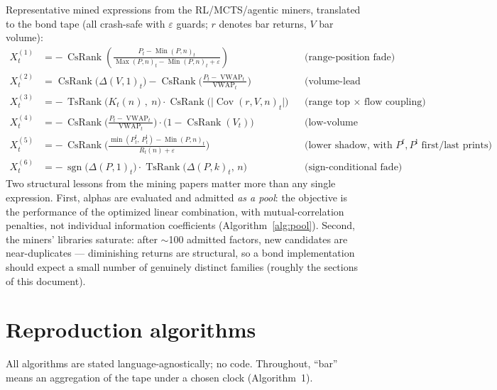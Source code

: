 \documentclass[11pt]{article}
\newcommand{\sgn}{\operatorname{sgn}}
\newcommand{\Rank}{\operatorname{CsRank}}
\newcommand{\TsRank}{\operatorname{TsRank}}
\DeclareMathOperator{\VWAP}{VWAP}
\DeclareMathOperator{\Cov}{Cov}
\newcounter{algo}
\newcounter{fac}
\begin{document}
Representative mined expressions from the RL/MCTS/agentic miners, translated to the bond tape (all crash-safe with $\varepsilon$ guards; $r$ denotes bar returns, $V$ bar volume):
{\small
\begin{align}
X^{(1)}_t &= -\,\Rank\!\left( \frac{P_t - \operatorname{Min}(P,n)_t}{\operatorname{Max}(P,n)_t - \operatorname{Min}(P,n)_t + \varepsilon} \right)
&&\text{(range-position fade)}\\[2pt]
X^{(2)}_t &= \Rank\big(\Delta(V,1)_t\big) - \Rank\!\Big(\tfrac{P_t - \VWAP_t}{\VWAP_t}\Big)
&&\text{(volume-lead divergence)}\\[2pt]
X^{(3)}_t &= -\,\TsRank\!\Big( K_t(n)\,,\ n \Big)\cdot \Rank\!\Big( \big|\Cov(r, V, n)_t\big| \Big)
&&\text{(range top $\times$ flow coupling)}\\[2pt]
X^{(4)}_t &= -\,\Rank\!\Big(\tfrac{P_t-\VWAP_t}{\VWAP_t}\Big)\cdot \big(1 - \Rank(V_t)\big)
&&\text{(low-volume dislocation fade)}\\[2pt]
X^{(5)}_t &= -\,\Rank\!\Big( \tfrac{\min(P^{\mathrm f}_t,\, P^{\mathrm l}_t) - \operatorname{Min}(P,n)_t}{R_t(n) + \varepsilon} \Big)
&&\text{(lower shadow, with $P^{\mathrm f},P^{\mathrm l}$ first/last prints)}\\[2pt]
X^{(6)}_t &= -\,\sgn\big(\Delta(P,1)_t\big)\cdot \TsRank\big(\Delta(P,k)_t,\, n\big)
&&\text{(sign-conditional fade)}
\end{align}}
Two structural lessons from the mining papers matter more than any single expression. First, alphas are evaluated and admitted \emph{as a pool}: the objective is the performance of the optimized linear combination, with mutual-correlation penalties, not individual information coefficients (Algorithm~\ref{alg:pool}). Second, the miners' libraries saturate: after $\sim$100 admitted factors, new candidates are near-duplicates --- diminishing returns are structural, so a bond implementation should expect a small number of genuinely distinct families (roughly the sections of this document).

\section{Reproduction algorithms}\label{sec:algos}

All algorithms are stated language-agnostically; no code. Throughout, ``bar'' means an aggregation of the tape under a chosen clock (Algorithm~1).
\end{document}
